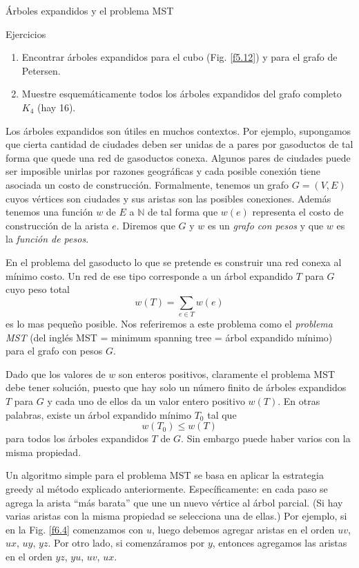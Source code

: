 \documentclass[11pt,spanish,makeidx]{amsbook}
\theoremstyle{definition}
\theoremstyle{remark}
\begin{document}
\begin{section}{Árboles expandidos y el problema MST}
\begin{subsection}{Ejercicios}
\begin{enumerate}
\item Encontrar árboles expandidos para el cubo (Fig. \ref{f5.12}) y para el grafo de Petersen.
\item Muestre esquemáticamente todos los árboles expandidos del grafo completo $K_4$ (hay 16).
\end{enumerate}
\end{subsection}

Los árboles expandidos son útiles en muchos contextos. Por ejemplo, su\-pon\-ga\-mos que cierta cantidad de ciudades deben ser unidas de a pares por gasoductos de tal forma que quede una red de gasoductos conexa. Algunos pares de ciudades puede ser imposible unirlas por razones geográficas y cada posible conexión tiene asociada un costo de construcción. Formalmente, tenemos un grafo $G=(V,E)$ cuyos vértices son ciudades y sus aristas son las posibles conexiones. Además te\-ne\-mos una función $w$ de $E$ a $\mathbb N$ de tal forma que $w(e)$ representa el costo de cons\-truc\-ción de la arista $e$. Diremos que $G$ y $w$ es un {\em grafo con pesos} y que $w$ es la {\em función de pesos}.      

En el problema del gasoducto lo que se pretende es construir una red conexa al mínimo costo. Un red de ese tipo corresponde a un árbol expandido $T$ para $G$ cuyo peso total
$$
w(T) = \sum_{e \in T} w(e)
$$
es lo mas pequeño posible. Nos referiremos a este problema como el {\em problema MST }(del inglés MST = minimum spanning tree =    árbol expandido mínimo) para el grafo con pesos $G$.  

Dado que los valores de $w$ son enteros positivos, claramente el problema MST debe tener solución, puesto que hay solo un número finito de árboles expandidos $T$ para $G$ y cada uno de ellos da un valor entero positivo $w(T)$. En otras palabras, existe un árbol expandido mínimo $T_0$ tal que
$$
w(T_0) \le w(T)
$$
para todos los árboles expandidos $T$ de $G$. Sin embargo puede haber varios con la misma propiedad.

Un algoritmo simple para el problema MST se basa en aplicar la estrategia greedy al método explicado anteriormente. Específicamente: en cada paso se agrega la arista ``más barata'' que une un nuevo vértice al árbol parcial. (Si hay varias aristas con la misma propiedad se selecciona una de ellas.) Por ejemplo, si en la Fig. \ref{f6.4} comenzamos con $u$, luego debemos agregar aristas en el orden $uv$, $ux$, $uy$, $yz$. Por otro lado, si comenzáramos por $y$, entonces agregamos las aristas en el orden $yz$, $yu$, $uv$, $ux$.


\end{section}
\end{document}
